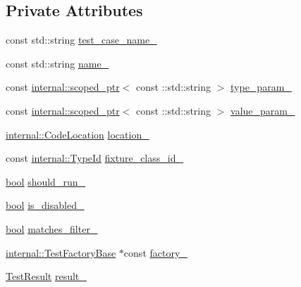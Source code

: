 \subsection*{Private Attributes}
\begin{DoxyCompactItemize}
\item 
const std\+::string \hyperlink{classtesting_1_1TestInfo_a3dcf626bbfc3756103be329c05377a5f}{test\+\_\+case\+\_\+name\+\_\+}
\item 
const std\+::string \hyperlink{classtesting_1_1TestInfo_a6bed52b7c3d66c8c5eac5fa2aaadba55}{name\+\_\+}
\item 
const \hyperlink{classtesting_1_1internal_1_1scoped__ptr}{internal\+::scoped\+\_\+ptr}$<$ const \+::std\+::string $>$ \hyperlink{classtesting_1_1TestInfo_ab4f53cfaf59e1b5cac858a9322697e88}{type\+\_\+param\+\_\+}
\item 
const \hyperlink{classtesting_1_1internal_1_1scoped__ptr}{internal\+::scoped\+\_\+ptr}$<$ const \+::std\+::string $>$ \hyperlink{classtesting_1_1TestInfo_ac3dd68ea96ebe82c6eab31e6e730a918}{value\+\_\+param\+\_\+}
\item 
\hyperlink{structtesting_1_1internal_1_1CodeLocation}{internal\+::\+Code\+Location} \hyperlink{classtesting_1_1TestInfo_a749494420174e6cf1949c7b411e8df6f}{location\+\_\+}
\item 
const \hyperlink{namespacetesting_1_1internal_ab1114197d3c657d8b7f8e0c5caa12d00}{internal\+::\+Type\+Id} \hyperlink{classtesting_1_1TestInfo_ad3284b7b9ebe61cc31440694091450ae}{fixture\+\_\+class\+\_\+id\+\_\+}
\item 
\hyperlink{classbool}{bool} \hyperlink{classtesting_1_1TestInfo_a89c3d8fb8b565532c34d3123240fd5cf}{should\+\_\+run\+\_\+}
\item 
\hyperlink{classbool}{bool} \hyperlink{classtesting_1_1TestInfo_af3765fc4f811296e0699b0a26430a7c7}{is\+\_\+disabled\+\_\+}
\item 
\hyperlink{classbool}{bool} \hyperlink{classtesting_1_1TestInfo_a397686f82b6dd68a209ab7b50eeb4932}{matches\+\_\+filter\+\_\+}
\item 
\hyperlink{classtesting_1_1internal_1_1TestFactoryBase}{internal\+::\+Test\+Factory\+Base} $\ast$const \hyperlink{classtesting_1_1TestInfo_a6bf2422602b877c73f6eb169a63cfea8}{factory\+\_\+}
\item 
\hyperlink{classtesting_1_1TestResult}{Test\+Result} \hyperlink{classtesting_1_1TestInfo_a108fd469897a8d4e5c4361947a5ed785}{result\+\_\+}
\end{DoxyCompactItemize}
